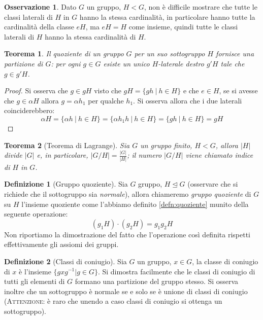 \documentclass[11pt]{article}
\theoremstyle{plain}
\newtheorem{thm}{Teorema}[section]
\theoremstyle{definition}
\newtheorem{defn}{Definizione}[section]
\newtheorem*{rem}{Osservazione}
\theoremstyle{remark}
\begin{document}
\begin{rem}
	Dato $G$ un gruppo, $H<G$, non è difficile mostrare che tutte le classi laterali di $H$ in $G$ hanno la stessa cardinalità, in particolare hanno tutte la cardinalità della classe $eH$, ma $eH=H$ come insieme, quindi tutte le classi laterali di $H$ hanno la stessa cardinalità di $H$.
\end{rem}


\begin{thm}
	Il quoziente di un gruppo $G$ per un suo sottogruppo $H$ fornisce una partizione di $G$: per ogni $g\in G$ esiste un unico $H$-laterale destro $g'H$ tale che $g\in g'H$. 
\end{thm}
\begin{proof}
	Si osserva che $g\in gH$ visto che $gH=\{gh\ |\ h\in H\}$ e che $e\in H$, se si avesse che $g\in \alpha H$ allora $g=\alpha h_1$ per qualche $h_1$. Si osserva allora che i due laterali coinciderebbero:
	\[
		\alpha H=\{ \alpha h\ |\ h\in H\} = \{ \alpha h_1 h\ |\ h\in H \} = \{ gh\ |\ h\in H\} = gH
	\]
\end{proof}

\begin{thm}[Teorema di Lagrange]
	Sia $G$ un gruppo finito, $H<G$, allora $|H|$ divide $|G|$ e, in particolare, $\displaystyle |G/H|=\frac{|G|}{|H|}$; il numero $|G/H|$ viene chiamato \textit{indice} di $H$ in $G$.
\end{thm}


\begin{defn}[Gruppo quoziente]
	Sia $G$ gruppo, $H\trianglelefteq G$ (osservare che si richiede che il sottogruppo sia \textit{normale}), allora chiameremo \textit{gruppo quoziente} di $G$ su $H$ l'insieme quoziente come l'abbiamo definito \eqref{defn:quoziente} munito della seguente operazione:
	\[
		(g_1H)\cdot(g_2H)=g_1g_2H
	\]
	Non riportiamo la dimostrazione del fatto che l'operazione così definita rispetti effettivamente gli assiomi dei gruppi.
\end{defn}

\begin{defn}[Classi di coniugio]
Sia $G$ un gruppo, $x \in G$, la classe di coniugio di $x$ è l'insieme $\{ gxg^{-1} | g\in G \}$. Si dimostra facilmente che le classi di coniugio di tutti gli elementi di $G$ formano una partizione del gruppo stesso. Si osserva inoltre che un sottogruppo è normale se e solo se è unione di classi di coniugio (\textsc{Attenzione:} è raro che unendo a caso classi di coniugio si ottenga un sottogruppo).
\end{defn}
\end{document}

